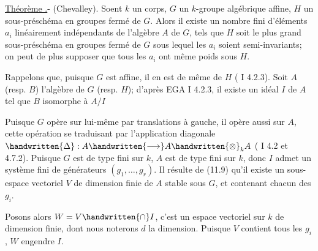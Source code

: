 \uline{Théorème .}- (Chevalley). Soent $k$ un corps, $G$ un $k$-groupe algébrique affine, $H$ un sous-préschéma en groupes fermé de $G$. Alors il existe un nombre fini d'éléments $a_i$ linéairement indépendants de l'algèbre $A$ de $G$, tels que $H$ soit le plus grand sous-préschéma en groupes fermé de $G$ sous lequel les $a_i$ soient semi-invariants; on peut de plus supposer que tous les $a_i$ ont même  poids\deleted{)} sous $H$.

Rappelons que, puisque $G$ est affine, il en est de même de $H$ ( I 4.2.3). Soit $A$ (resp. $B$) l'algèbre de $G$ (resp. $H$); d'après EGA I 4.2.3, il existe un idéal $I$ de $A$ tel que $B$  isomorphe à $A/I$ Puisque $G$ opère sur lui-même par translations à gauche, il opère aussi sur $A$, cette opération se traduisant par l'application diagonale $\handwritten{\Delta}:A\handwritten{\longrightarrow}A\handwritten{\otimes}_k A$ ( I 4.2 et 4.7.2). Puisque $G$ est de type fini sur $k$, $A$ est de type fini sur $k$, donc $I$  admet un système fini de générateurs $(g_1,\ldots,g_r)$. Il résulte de (11.9) qu'il existe un sous-espace vectoriel $V$ de dimension finie de $A$  stable sous $G$, et contenant chacun des $g_i$.

Posons alors $W=V\handwritten{\cap}I$, c'est un espace vectoriel sur $k$ de dimension finie, dont nous noterons $d$ la dimension. Puisque $V$ contient tous les $g_i$, $W$ engendre  $I$.

